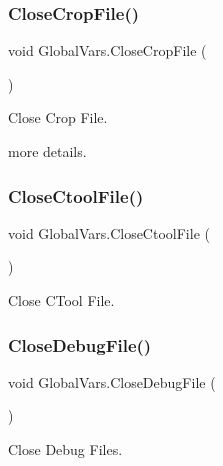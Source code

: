 \subsubsection{\texorpdfstring{CloseCropFile()}{CloseCropFile()}}
{\footnotesize\ttfamily void Global\+Vars.\+Close\+Crop\+File (\begin{DoxyParamCaption}{ }\end{DoxyParamCaption})\hspace{0.3cm}{\ttfamily [inline]}}



Close Crop File. 

more details. \mbox{\label{class_global_vars_a11a63936e576b275d962584c5d415147}} 
\subsubsection{\texorpdfstring{CloseCtoolFile()}{CloseCtoolFile()}}
{\footnotesize\ttfamily void Global\+Vars.\+Close\+Ctool\+File (\begin{DoxyParamCaption}{ }\end{DoxyParamCaption})\hspace{0.3cm}{\ttfamily [inline]}}



Close C\+Tool File. 

\mbox{\label{class_global_vars_ab2ed77b9ddaa227fa52cd7cfec57e531}} 
\subsubsection{\texorpdfstring{CloseDebugFile()}{CloseDebugFile()}}
{\footnotesize\ttfamily void Global\+Vars.\+Close\+Debug\+File (\begin{DoxyParamCaption}{ }\end{DoxyParamCaption})\hspace{0.3cm}{\ttfamily [inline]}}



Close Debug Files. 

\mbox{\label{class_global_vars_a60514ab77561eb58b7f8451a91a5d7ad}} 
